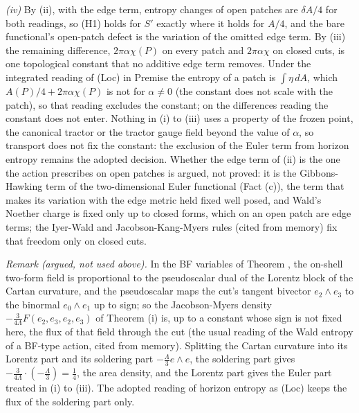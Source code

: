 \emph{(iv)} By (ii), with the edge term, entropy changes of open patches are $\delta A/4$ for both readings, so (H1) holds for $S'$ exactly where it holds for $A/4$, and the bare functional's open-patch defect is the variation of the omitted edge term. By (iii) the remaining difference, $2\pi\alpha\chi(P)$ on every patch and $2\pi\alpha\chi$ on closed cuts, is one topological constant that no additive edge term removes. Under the integrated reading of (Loc) in Premise  the entropy of a patch is $\int\eta\,dA$, which $A(P)/4 + 2\pi\alpha\chi(P)$ is not for $\alpha \neq 0$ (the constant does not scale with the patch), so that reading excludes the constant; on the differences reading the constant does not enter. Nothing in (i) to (iii) uses a property of the frozen point, the canonical tractor or the tractor gauge field beyond the value of $\alpha$, so transport does not fix the constant: the exclusion of the Euler term from horizon entropy remains the adopted decision. Whether the edge term of (ii) is the one the action prescribes on open patches is argued, not proved: it is the Gibbons-Hawking term of the two-dimensional Euler functional (Fact (c)), the term that makes its variation with the edge metric held fixed well posed, and Wald's Noether charge is fixed only up to closed forms, which on an open patch are edge terms; the Iyer-Wald and Jacobson-Kang-Myers rules (cited from memory) fix that freedom only on closed cuts.


\emph{Remark (argued, not used above).} In the BF variables of Theorem , the on-shell two-form field is proportional to the pseudoscalar dual of the Lorentz block of the Cartan curvature, and the pseudoscalar maps the cut's tangent bivector $e_{2}\wedge e_{3}$ to the binormal $e_{0}\wedge e_{1}$ up to sign; so the Jacobson-Myers density $-\tfrac{3}{4\Lambda}F(e_{2}, e_{3}, e_{2}, e_{3})$ of Theorem (i) is, up to a constant whose sign is not fixed here, the flux of that field through the cut (the usual reading of the Wald entropy of a BF-type action, cited from memory). Splitting the Cartan curvature into its Lorentz part and its soldering part $-\tfrac{\Lambda}{3}e\wedge e$, the soldering part gives $-\tfrac{3}{4\Lambda}\cdot(-\tfrac{\Lambda}{3}) = \tfrac14$, the area density, and the Lorentz part gives the Euler part treated in (i) to (iii). The adopted reading of horizon entropy as (Loc) keeps the flux of the soldering part only.
